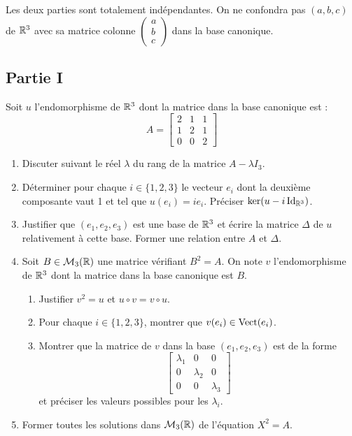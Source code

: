 Les deux parties sont totalement indépendantes.\newline 
On ne confondra pas $(a,b,c)$ de $\mathbb{R}^3$ avec sa matrice colonne
$\begin{pmatrix} a \\ b \\ c \end{pmatrix}$ dans la base canonique.

\subsection*{Partie I}
Soit $u$ l'endomorphisme de $\mathbb{R}^3$ dont la matrice dans la base canonique est :
\begin{displaymath}
A = \left[ \begin{array}{lll}
2 & 1 & 1 \\ 
1 & 2 & 1 \\ 
0 & 0 & 2
\end{array}
\right] 
\end{displaymath}
\begin{enumerate}
\item Discuter suivant le réel $\lambda$ du rang de la matrice $A-\lambda I_3$.
\item Déterminer pour chaque $i\in\{1,2,3\}$ le vecteur $e_i$ dont la deuxième composante vaut 1 et tel que $u(e_i)=ie_i$. 
Préciser $\ker (u-i\operatorname{Id}_{\mathbb{R}^3})$.

\item Justifier que $(e_1,e_2,e_3)$ est une base de $\mathbb{R}^3$ et écrire la matrice $\Delta$ de $u$ relativement à cette base. Former une relation entre $A$ et $\Delta$. 
\item Soit $B\in \mathcal{M}_{3}(\mathbb{R})$ une matrice vérifiant $B^2=A$. On note $v$ l'endomorphisme de $\mathbb{R}^3$ dont la matrice dans la base canonique est $B$.
\begin{enumerate}
\item Justifier $v^2=u$ et $u\circ v = v\circ u$.
\item Pour chaque $i\in\{1,2,3\}$, montrer que $v(e_i)\in \operatorname{Vect} (e_i)$.
\item Montrer que la matrice de $v$ dans la base $(e_1,e_2,e_3)$ est de la forme
\begin{displaymath}
\left[ 
\begin{array}{lll} 
\lambda_1 & 0 & 0 \\ 
0 & \lambda_2 & 0 \\ 
0 & 0 & \lambda_3
\end{array} 
\right] 
\end{displaymath}
 et préciser les valeurs possibles pour les $\lambda_i$.
\end{enumerate}
\item Former toutes les solutions dans $\mathcal{M}_{3}(\mathbb{R})$ de l'équation $X^2=A$.
\end{enumerate}

